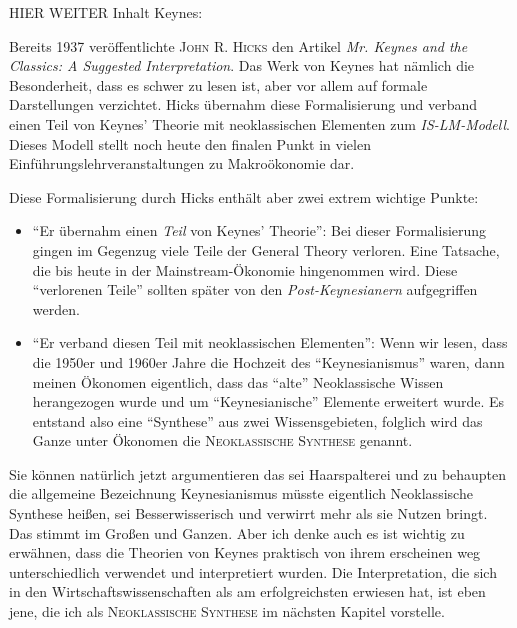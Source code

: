 HIER WEITER
Inhalt Keynes:






Bereits 1937 veröffentlichte \textsc{John R. Hicks} den Artikel \textit{Mr. Keynes and the Classics: A Suggested Interpretation}. Das Werk von Keynes hat nämlich die Besonderheit, dass es schwer zu lesen ist, aber vor allem auf formale Darstellungen verzichtet. Hicks übernahm diese Formalisierung und verband einen Teil von Keynes' Theorie mit neoklassischen Elementen zum \textit{IS-LM-Modell}. Dieses Modell stellt noch heute den finalen Punkt in vielen Einführungslehrveranstaltungen zu Makroökonomie dar.

Diese Formalisierung durch Hicks enthält aber zwei extrem wichtige Punkte:
\begin{itemize}
	\item "`Er übernahm einen \textit{Teil} von Keynes' Theorie"': Bei dieser Formalisierung gingen im Gegenzug viele Teile der General Theory verloren. Eine Tatsache, die bis heute in der Mainstream-Ökonomie hingenommen wird. Diese "`verlorenen Teile"' sollten später von den \textit{Post-Keynesianern} aufgegriffen werden.
	\item "`Er verband diesen Teil mit neoklassischen Elementen"': Wenn wir lesen, dass die 1950er und 1960er Jahre die Hochzeit des "`Keynesianismus"' waren, dann meinen Ökonomen eigentlich, dass das "`alte"' Neoklassische Wissen herangezogen wurde und um "`Keynesianische"' Elemente erweitert wurde. Es entstand also eine "`Synthese"' aus zwei Wissensgebieten, folglich wird das Ganze unter Ökonomen die \textsc{Neoklassische Synthese} genannt.
\end{itemize}

Sie können natürlich jetzt argumentieren das sei Haarspalterei und zu behaupten die allgemeine Bezeichnung Keynesianismus müsste eigentlich Neoklassische Synthese heißen, sei Besserwisserisch und verwirrt mehr als sie Nutzen bringt. Das stimmt im Großen und Ganzen. Aber ich denke auch es ist wichtig zu erwähnen, dass die Theorien von Keynes praktisch von ihrem erscheinen weg unterschiedlich verwendet und interpretiert wurden. Die Interpretation, die sich in den Wirtschaftswissenschaften als am erfolgreichsten erwiesen hat, ist eben jene, die ich als \textsc{Neoklassische Synthese} im nächsten Kapitel vorstelle. 



